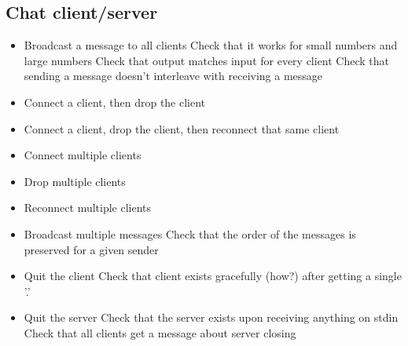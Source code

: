 \documentclass[]{article}
\begin{document}
\subsection{Chat client/server}
\begin{itemize}
	\item Broadcast a message to all clients
	\subitem Check that it works for small numbers and large numbers
	\subitem Check that output matches input for every client
	\subitem Check that sending a message doesn't interleave with receiving a message
	\item Connect a client, then drop the client
	\item Connect a client, drop the client, then reconnect that same client
	\item Connect multiple clients
	\item Drop multiple clients
	\item Reconnect multiple clients
	\item Broadcast multiple messages
	\subitem Check that the order of the messages is preserved for a given sender
	\item Quit the client
	\subitem Check that client exists gracefully (how?) after getting a single '.'
	\item Quit the server
	\subitem Check that the server exists upon receiving anything on stdin
	\subitem Check that all clients get a message about server closing
	
\end{itemize}
\end{document}
